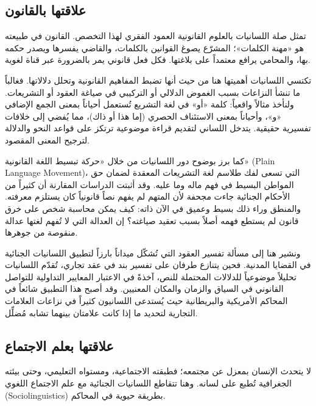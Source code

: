 \subsection{علاقتها بالقانون}

تمثل صلة اللسانيات بالعلوم القانونية العمود الفقري لهذا التخصص. القانون في طبيعته هو «مهنة الكلمات»؛ المشرّع يصوغ القوانين بالكلمات، والقاضي يفسرها ويصدر حكمه بها، والمحامي يرافع معتمداً على بلاغتها. فكل فعل قانوني يمر بالضرورة عبر قناة لغوية\autocite[85]{alabadi2020}.

تكتسي اللسانيات أهميتها هنا من حيث أنها تضبط المفاهيم القانونية وتحلل دلالاتها. فغالباً ما تنشأ النزاعات بسبب الغموض الدلالي أو التركيبي في صياغة العقود أو التشريعات. ولنأخذ مثالاً واقعياً: كلمة «أو» في لغة التشريع تُستعمل أحياناً بمعنى الجمع الإضافي «و»، وأحياناً بمعنى الاستئناف الحصري (إما هذا أو ذاك)، مما يُفضي إلى خلافات تفسيرية حقيقية. يتدخل اللساني لتقديم قراءة موضوعية ترتكز على قواعد النحو والدلالة لترجيح المعنى المقصود.\autocite[20]{nader2023}

كما برز بوضوح دور اللسانيات من خلال «حركة تبسيط اللغة القانونية» (\textenglish{Plain Language Movement})\autocite[98]{alabadi2020}، التي تسعى لفك طلاسم لغة التشريعات المعقدة لضمان حق المواطن البسيط في فهم ماله وما عليه. وقد أثبتت الدراسات المقارنة أن كثيراً من الأحكام الجنائية جاءت مجحفة لأن المتهم لم يفهم نصاً قانونياً كان يستلزم معرفته. والمنطق وراء ذلك بسيط وعميق في الآن ذاته: كيف يمكن محاسبة شخص على خرق قانون لم يستطع فهمه أصلاً بسبب تعقيد صياغته؟ إن العدالة التي لا تُفهم لغتها عدالة منقوصة من جوهرها.

ونشير هنا إلى مسألة تفسير العقود التي تُشكّل ميداناً بارزاً لتطبيق اللسانيات الجنائية في القضايا المدنية. فحين يتنازع طرفان على تفسير بند في عقد تجاري، تُقدّم اللسانيات تحليلاً موضوعياً للدلالات المحتملة للنص، آخذةً في الاعتبار المعايير التداولية للتواصل القانوني في السياق والزمان والمكان المعنيين. وقد أصبح هذا التطبيق شائعاً في المحاكم الأمريكية والبريطانية حيث يُستدعى اللسانيون كثيراً في نزاعات العلامات التجارية لتحديد ما إذا كانت علامتان بينهما تشابه مُضلِّل\autocite[24]{alabadi2020}.

\subsection{علاقتها بعلم الاجتماع}

لا يتحدث الإنسان بمعزل عن مجتمعه؛ فطبقته الاجتماعية، ومستواه التعليمي، وحتى بيئته الجغرافية تُطبع على لسانه. وهنا تتقاطع اللسانيات الجنائية مع علم الاجتماع اللغوي (\textenglish{Sociolinguistics}) بطريقة حيوية في المحاكم.

